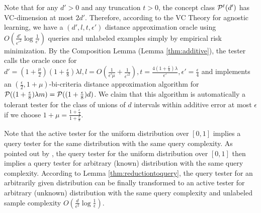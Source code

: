 Note that for any $d'>0$ and any truncation $t>0$, the concept class ${\mathcal{P}}^{t}(d')$ has VC-dimension at most $2d'$. Therefore, according to the VC Theory for agnostic learning, we have a $(d',l,t,\epsilon')$ distance approximation oracle using $O(\frac{d'}{{\epsilon'}^2}\log\frac{1}{\epsilon'})$ queries and unlabeled examples simply by empirical risk minimization. By the Composition Lemma (Lemma \ref{thm:additive}), the tester calls the oracle once for $d'=(1+\frac\mu 2)(1+\frac\epsilon 8)\lambda l,l=O(\frac 1{\epsilon'\mu}+\frac 1{{\epsilon'}^2}),t=\frac{4(1+\frac\epsilon 8)\lambda}{\epsilon'},\epsilon'=\frac{\epsilon}{4}$ and implements an $(\frac{\epsilon}{2},1+\mu)$-bi-criteria distance approximation algorithm for ${\mathcal{P}}((1+\frac{\epsilon}{8})\lambda m)={\mathcal{P}}((1+\frac{\epsilon}{8})d)$. We claim that this algorithm is automatically a tolerant tester for the class of unions of $d$ intervals within additive error at most $\epsilon$ if we choose $1+\mu=\frac{1+\frac\epsilon 4}{1+\frac\epsilon 8}$. 

Note that the active tester for the uniform distribution over $[0,1]$ implies a query tester for the same distribution with the same query complexity. As pointed out by \citet{BBBY12}, the query tester for the uniform distribution over $[0,1]$ then implies a query tester for arbitrary (known) distribution with the same query complexity. According to Lemma \ref{thm:reductiontoquery}, the query tester for an arbitrarily given distribution can be finally transformed to an active tester for arbitrary (unknown) distribution with the same query complexity and unlabeled sample complexity $O(\frac{d}{\epsilon^2}\log\frac{1}{\epsilon})$.


